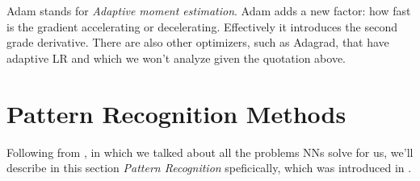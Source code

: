 Adam stands for \emph{Adaptive moment estimation}. Adam adds a new factor: how fast is the gradient accelerating or decelerating. Effectively it introduces the second grade derivative.
There are also other optimizers, such as Adagrad, that have adaptive LR and which we won't analyze given the quotation above.

\section{Pattern Recognition Methods}\label{s:patt}

Following from , in which we talked about all the problems NNs solve for us, we'll describe in this section \emph{Pattern Recognition} speficically, which was introduced in .


